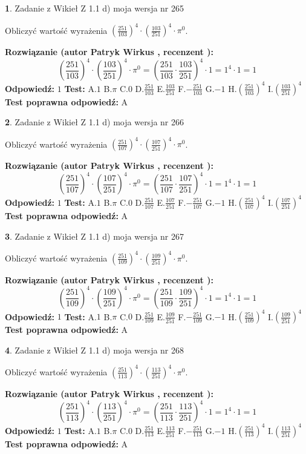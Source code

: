 \documentclass[12pt, a4paper]{article}
\theoremstyle{definition} %
\newtheorem{zad}{}
\newcommand{\zadStart}[1]{\begin{zad}#1\newline}
\newcommand{\zadStop}{\end{zad}}
\newcommand{\rozwStart}[2]{\noindent \textbf{Rozwiązanie (autor #1 , recenzent #2): }\newline}
\newcommand{\rozwStop}{\newline}
\newcommand{\odpStart}{\noindent \textbf{Odpowiedź:}\newline}
\newcommand{\odpStop}{\newline}
\newcommand{\testStart}{\noindent \textbf{Test:}\newline}
\newcommand{\testStop}{\newline}
\newcommand{\kluczStart}{\noindent \textbf{Test poprawna odpowiedź:}\newline}
\newcommand{\kluczStop}{\newline}
\begin{document}
\zadStart{Zadanie z Wikieł Z 1.1 d) moja wersja nr 265}

Obliczyć wartość wyrażenia $(\frac{251}{103})^{4} \cdot (\frac{103}{251})^{4} \cdot \pi^{0}$.
\zadStop
\rozwStart{Patryk Wirkus}{}
$$(\frac{251}{103})^{4} \cdot (\frac{103}{251})^{4} \cdot \pi^{0} = (\frac{251}{103} \cdot \frac{103}{251})^{4} \cdot 1 = 1^{4} \cdot 1 = 1$$
\rozwStop
\odpStart
$1$
\odpStop
\testStart
A.$1$ B.$\pi$ C.$0$ D.$\frac{251}{103}$ E.$\frac{103}{251}$
F.$-\frac{251}{103}$ G.$-1$
H.$(\frac{251}{103})^{4}$
I.$(\frac{103}{251})^{4}$
\testStop
\kluczStart
A
\kluczStop



\zadStart{Zadanie z Wikieł Z 1.1 d) moja wersja nr 266}

Obliczyć wartość wyrażenia $(\frac{251}{107})^{4} \cdot (\frac{107}{251})^{4} \cdot \pi^{0}$.
\zadStop
\rozwStart{Patryk Wirkus}{}
$$(\frac{251}{107})^{4} \cdot (\frac{107}{251})^{4} \cdot \pi^{0} = (\frac{251}{107} \cdot \frac{107}{251})^{4} \cdot 1 = 1^{4} \cdot 1 = 1$$
\rozwStop
\odpStart
$1$
\odpStop
\testStart
A.$1$ B.$\pi$ C.$0$ D.$\frac{251}{107}$ E.$\frac{107}{251}$
F.$-\frac{251}{107}$ G.$-1$
H.$(\frac{251}{107})^{4}$
I.$(\frac{107}{251})^{4}$
\testStop
\kluczStart
A
\kluczStop



\zadStart{Zadanie z Wikieł Z 1.1 d) moja wersja nr 267}

Obliczyć wartość wyrażenia $(\frac{251}{109})^{4} \cdot (\frac{109}{251})^{4} \cdot \pi^{0}$.
\zadStop
\rozwStart{Patryk Wirkus}{}
$$(\frac{251}{109})^{4} \cdot (\frac{109}{251})^{4} \cdot \pi^{0} = (\frac{251}{109} \cdot \frac{109}{251})^{4} \cdot 1 = 1^{4} \cdot 1 = 1$$
\rozwStop
\odpStart
$1$
\odpStop
\testStart
A.$1$ B.$\pi$ C.$0$ D.$\frac{251}{109}$ E.$\frac{109}{251}$
F.$-\frac{251}{109}$ G.$-1$
H.$(\frac{251}{109})^{4}$
I.$(\frac{109}{251})^{4}$
\testStop
\kluczStart
A
\kluczStop



\zadStart{Zadanie z Wikieł Z 1.1 d) moja wersja nr 268}

Obliczyć wartość wyrażenia $(\frac{251}{113})^{4} \cdot (\frac{113}{251})^{4} \cdot \pi^{0}$.
\zadStop
\rozwStart{Patryk Wirkus}{}
$$(\frac{251}{113})^{4} \cdot (\frac{113}{251})^{4} \cdot \pi^{0} = (\frac{251}{113} \cdot \frac{113}{251})^{4} \cdot 1 = 1^{4} \cdot 1 = 1$$
\rozwStop
\odpStart
$1$
\odpStop
\testStart
A.$1$ B.$\pi$ C.$0$ D.$\frac{251}{113}$ E.$\frac{113}{251}$
F.$-\frac{251}{113}$ G.$-1$
H.$(\frac{251}{113})^{4}$
I.$(\frac{113}{251})^{4}$
\testStop
\kluczStart
A
\kluczStop
\end{document}
